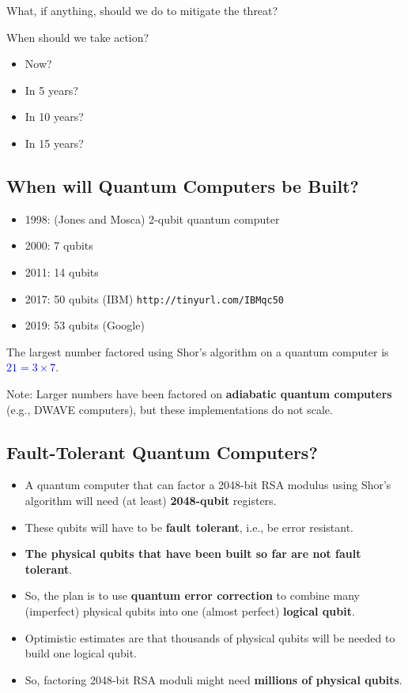 \documentclass[12pt,titlepage]{article}
\begin{document}
What, if anything, should we do to mitigate the threat?

When should we take action? \begin{itemize}
	\item Now?
	\item In 5 years?
	\item In 10 years?
	\item In 15 years?
\end{itemize}
\subsection{When will Quantum Computers be Built?}
\begin{itemize}
	\item 1998: (Jones and Mosca) 2-qubit quantum computer
	\item 2000: 7 qubits
	\item 2011: 14 qubits
	\item 2017: 50 qubits (IBM) \texttt{http://tinyurl.com/IBMqc50}
	\item 2019: 53 qubits (Google)
\end{itemize}

The largest number factored using Shor’s algorithm on a quantum computer is \textcolor{blue}{$21 = 3 \times 7$}.

Note: Larger numbers have been factored on \textbf{adiabatic quantum computers} (e.g., DWAVE computers), but these implementations do not scale.

\subsection{Fault-Tolerant Quantum Computers?}
\begin{itemize}
	\item A quantum computer that can factor a 2048-bit RSA modulus using Shor’s algorithm will need (at least) \textbf{2048-qubit} registers.
	\item These qubits will have to be \textbf{fault tolerant}, i.e., be error resistant.
	\item \textbf{The physical qubits that have been built so far are not fault tolerant}.
	\item So, the plan is to use \textbf{quantum error correction} to combine many (imperfect) physical qubits into one (almost perfect) \textbf{logical qubit}.
	\item Optimistic estimates are that thousands of physical qubits will be needed to build one logical qubit.
	\item So, factoring 2048-bit RSA moduli might need \textbf{millions of physical qubits}.
\end{itemize}
\end{document}

